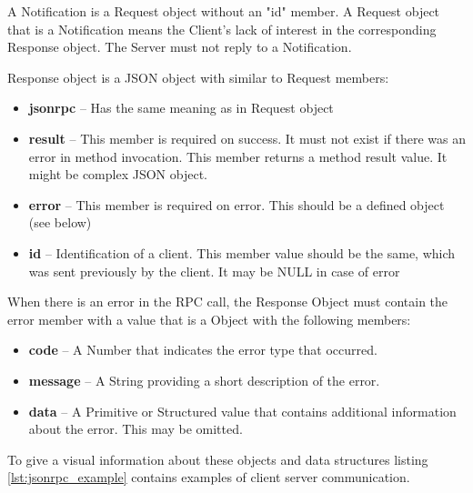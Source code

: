 A Notification is a Request object without an "id" member.
A Request object that is a Notification means the Client's lack of interest in the corresponding Response object. 
The Server must not reply to a Notification.

Response object is a JSON object with similar to Request members:

\begin{itemize}
\item \textbf{jsonrpc} -- Has the same meaning as in Request object

\item \textbf{result} --  This member is required on success. It must not exist if there was an error in method invocation.
	This member returns a method result value. It might be complex JSON object. 
\item \textbf{error} --  This member is required on error. This should be a defined object (see below)   

\item \textbf{id} --  Identification  of a client. This member value should be the same, which was sent previously by the client. It may be NULL in case of error
 \end{itemize}

 When there is an error in the RPC call, the Response Object must contain the error member with a value that is a Object with the following members:
\begin{itemize}
\item \textbf{code} -- A Number that indicates the error type that occurred.
\item \textbf{message} --  A String providing a short description of the error.
\item \textbf{data} --     A Primitive or Structured value that contains additional information about the error. This may be omitted.
\end{itemize}	

To give a visual information about these objects and data structures listing \ref{lst:jsonrpc_example} contains examples of client server communication.

